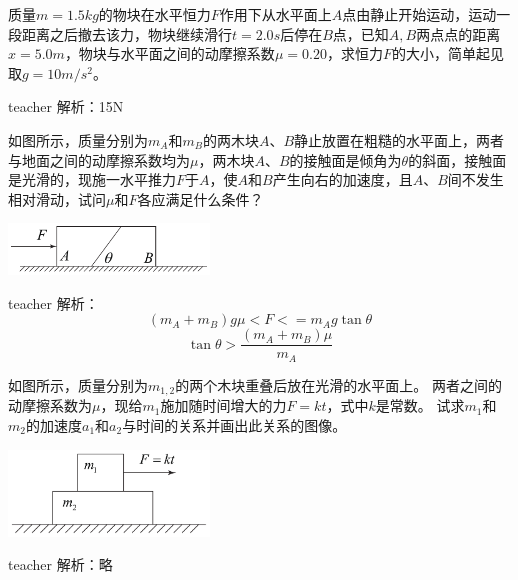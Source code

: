 \begin{example}

质量$m=1.5\unit{kg}$的物块在水平恒力$F$作用下从水平面上$ A $点由静止开始运动，运动一段距离之后撤去该力，物块继续滑行$ t=2.0\unit{s} $后停在$ B $点，已知$ A,B $两点点的距离$x = 5.0\unit{m}$，物块与水平面之间的动摩擦系数$ \mu = 0.20 $，求恒力$ F $的大小，简单起见取$g = 10\unit{m/s^2}$。
\begin{taggedblock}{teacher}
\newline
解析：15N
\end{taggedblock}
\end{example}

\begin{example}
	
	如图所示，质量分别为$m_A$和$m_B$的两木块$A$、$B$静止放置在粗糙的水平面上，两者与地面之间的动摩擦系数均为$\mu$，两木块$A$、$B$的接触面是倾角为$\theta$的斜面，接触面是光滑的，现施一水平推力$F$于$A$，使$ A $和$ B $产生向右的加速度，且$ A $、$ B $间不发生相对滑动，试问$ \mu $和$ F $各应满足什么条件？
	\begin{flushright}
		\includegraphics[width = 0.4\textwidth]{images/newton-1.pdf} 
	\end{flushright}
	\begin{taggedblock}{teacher}
		\noindent
		解析：\[(m_A+m_B)g\mu<F<=m_Ag\tan\theta\]
		\[\tan\theta>\frac{(m_A+m_B)\mu}{m_A}\]
	\end{taggedblock}
\end{example}

\begin{example}
	
	如图所示，质量分别为$m_{1,2}$的两个木块重叠后放在光滑的水平面上。
	两者之间的动摩擦系数为$\mu$，现给$m_1$施加随时间增大的力$F=kt$，式中$k$是常数。
	试求$m_1$和$m_2$的加速度$a_1$和$a_2$与时间的关系并画出此关系的图像。
	\begin{flushright}
		\includegraphics[width = 0.4\textwidth]{images/newton-8.pdf} 
	\end{flushright}
	\begin{taggedblock}{teacher}
		\noindent
		解析：略
	\end{taggedblock}
\end{example}


